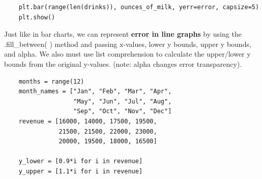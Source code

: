 \documentclass[11pt, a4paper]{article}
\begin{document}
\begin{spacing}{1.1}
\begin{lstlisting}
	plt.bar(range(len(drinks)), ounces_of_milk, yerr=error, capsize=5)
	plt.show() \end{lstlisting} \newpage
	
	\noindent Just like in bar charts, we can represent \textbf{error in line graphs} by using the .fill\_between( ) method and passing x-values, lower y bounds, upper y bounds, and alpha. We also must use list comprehension to calculate the upper/lower y bounds from the original y-values. (note: alpha changes error transparency).\\
	\begin{minipage}[c]{9.2cm}
	\begin{lstlisting}
	months = range(12)
	month_names = ["Jan", "Feb", "Mar", "Apr", 
	               "May", "Jun", "Jul", "Aug", 
	               "Sep", "Oct", "Nov", "Dec"]
	revenue = [16000, 14000, 17500, 19500, 
	           21500, 21500, 22000, 23000, 
 	           20000, 19500, 18000, 16500]
	
	y_lower = [0.9*i for i in revenue]
	y_upper = [1.1*i for i in revenue]
	

\end{lstlisting}
\end{minipage}
\end{spacing}
\end{document}
